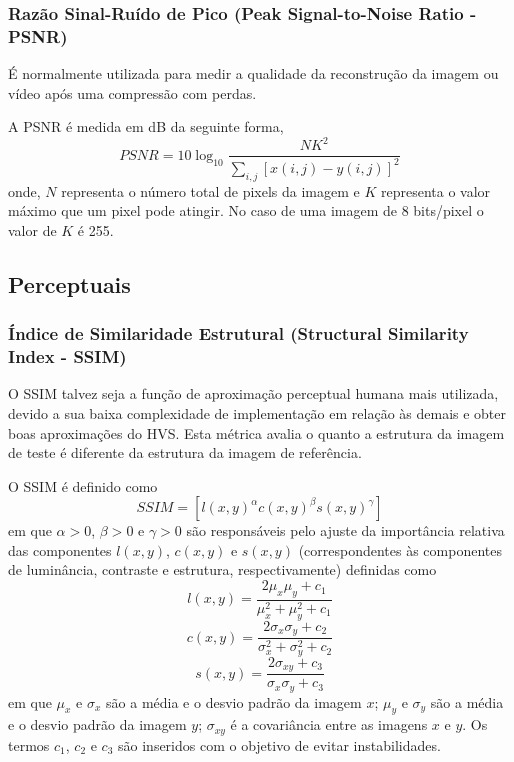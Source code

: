 \subsubsection{Razão Sinal-Ruído de Pico (Peak Signal-to-Noise Ratio - PSNR)}
\label{psnr}

É normalmente utilizada para medir a qualidade da reconstrução da imagem ou vídeo após uma compressão com perdas.

A PSNR é medida em dB da seguinte forma,
\begin{equation}
PSNR = 10\log_{10}{\frac{NK^2}{\sum_{i,j}[x(i,j)-y(i,j)]^2}}
\end{equation}
onde, $ N $ representa o número total de pixels da imagem e $ K $ representa o valor máximo que um pixel pode atingir. No caso de uma imagem de 8 bits/pixel o valor de $ K $  é 255.

\subsection{Perceptuais}
\label{perceptuais}



\subsubsection{Índice de Similaridade Estrutural (Structural Similarity Index - SSIM)}
\label{ssim}

O SSIM talvez seja a função de aproximação perceptual humana mais utilizada, devido a sua baixa complexidade de implementação em relação às demais e obter boas aproximações do HVS. Esta métrica avalia o quanto a estrutura da imagem de teste é diferente da estrutura da imagem de referência.

O SSIM é definido como
\begin{equation}
SSIM = \left[ l(x,y)^{\alpha}c(x,y)^{\beta}s(x,y)^{\gamma}
\right]
\end{equation}
em que $ \alpha > 0 $, $ \beta > 0 $ e $ \gamma > 0 $ são responsáveis pelo ajuste da importância relativa das
componentes $ l(x,y) $, $ c(x,y) $ e $ s(x,y) $ (correspondentes às componentes de luminância, contraste e estrutura, respectivamente) definidas como
\begin{equation}
l(x,y) = \frac{2 \mu_x \mu_y + c_1}{\mu_x^2 + \mu_y^2 + c_1}
\end{equation}
\begin{equation}
c(x,y) = \frac{2 \sigma_x \sigma_y + c_2}{\sigma_x^2 + \sigma_y^2 + c_2}
\end{equation}
\begin{equation}
s(x,y) = \frac{2 \sigma_{xy}+c_3}{\sigma_x \sigma_y + c_3}
\end{equation}
em que $ \mu_x $ e $ \sigma_x $ são a média e o desvio padrão da imagem $ x $; $ \mu_y $ e $ \sigma_y $ são a média e o desvio padrão da imagem $ y $; $ \sigma_{xy} $ é a covariância entre as imagens $ x $ e $ y $. Os termos $ c_1 $, $ c_2 $ e $ c_3 $ são inseridos com o objetivo de evitar instabilidades.

